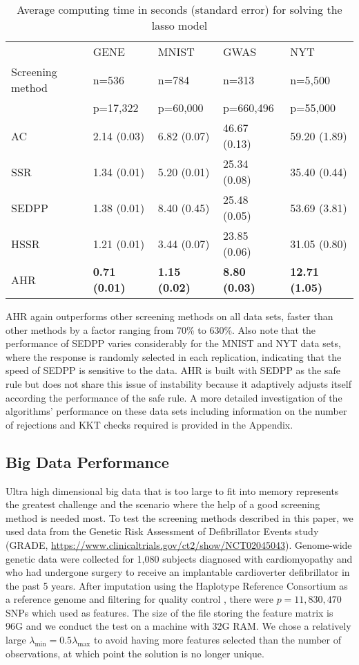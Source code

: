\begin{table}[ht]
\centering
\begin{tabular}{lllll}
\toprule
 & GENE & MNIST & GWAS & NYT \\
Screening method & n=536 & n=784 & n=313 & n=5,500 \\
       & p=17,322 & p=60,000 & p=660,496 & p=55,000 \\
\midrule
AC & 2.14 (0.03) & 6.82 (0.07) & 46.67 (0.13) & 59.20 (1.89) \\
SSR & 1.34 (0.01) & 5.20 (0.01) & 25.34 (0.08) & 35.40 (0.44) \\
SEDPP & 1.38 (0.01) & 8.40 (0.45) & 25.48 (0.05) & 53.69 (3.81) \\
HSSR & 1.21 (0.01) & 3.44 (0.07) & 23.85 (0.06) & 31.05 (0.80) \\
AHR & \textbf{0.71 (0.01)} & \textbf{1.15 (0.02)} & \textbf{8.80 (0.03)} & \textbf{12.71 (1.05)} \\
\bottomrule
\end{tabular}
\caption{Average computing time in seconds (standard error) for solving the lasso model}
\label{Tab:real}
\end{table}

AHR again outperforms other screening methods on all data sets, faster than other methods by a factor ranging from 70\% to 630\%. Also note that the performance of SEDPP varies considerably for the MNIST and NYT data sets, where the response is randomly selected in each replication, indicating that the speed of SEDPP is sensitive to the data. AHR is built with SEDPP as the safe rule but does not share this issue of instability because it adaptively adjusts itself according the performance of the safe rule. A more detailed investigation of the algorithms' performance on these data sets including information on the number of rejections and KKT checks required is provided in the Appendix.

\subsection{Big Data Performance}

Ultra high dimensional big data that is too large to fit into memory represents the greatest challenge and the scenario where the help of a good screening method is needed most. To test the screening methods described in this paper, we used data from the Genetic Risk Assessment of Defibrillator Events study (GRADE, \url{https://www.clinicaltrials.gov/ct2/show/NCT02045043}). Genome-wide genetic data were collected for 1,080 subjects diagnosed with cardiomyopathy and who had undergone surgery to receive an implantable cardioverter defibrillator in the past 5 years. After imputation using the Haplotype Reference Consortium as a reference genome and filtering for quality control \citep{Das2016}, there were $p=11,830,470$ SNPs which used as features. The size of the file storing the feature matrix is 96G and we conduct the test on a machine with 32G RAM. We chose a relatively large $\lambda_{\min} =0.5\lambda_{\max}$ to avoid having more features selected than the number of observations, at which point the solution is no longer unique.

